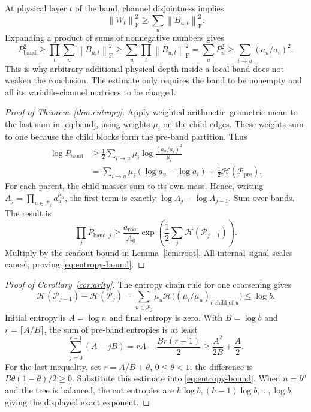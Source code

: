 \documentclass[11pt]{article}
\theoremstyle{remark}\newtheorem{remark}[theorem]{Remark}
\newcommand{\norm}[1]{\left\lVert#1\right\rVert}
\newcommand{\cP}{\mathcal P}
\newcommand{\ent}{\mathcal H}
\begin{document}
At physical layer $t$ of the band, channel disjointness implies
\[
 \norm{W_t}_{\mathrm F}^2\ge\sum_u
                    \norm{B_{u,t}}_{\mathrm F}^2.
\]
Expanding a product of sums of nonnegative numbers gives
\begin{equation}\label{eq:band}
 P_{\mathrm{band}}^2
 \ge\prod_t\sum_u\norm{B_{u,t}}_{\mathrm F}^2
 \ge\sum_u\prod_t\norm{B_{u,t}}_{\mathrm F}^2
 =\sum_u P_u^2
 \ge\sum_{i\to u}(a_u/a_i)^2.
\end{equation}
This is why arbitrary additional physical depth inside a local band does not
weaken the conclusion. The estimate only requires the band to be nonempty
and all its variable-channel matrices to be charged.

\begin{proof}[Proof of Theorem~\ref{thm:entropy}]
Apply weighted arithmetic--geometric mean to the last sum in
\eqref{eq:band}, using weights $\mu_i$ on the child edges. These weights sum
to one because the child blocks form the pre-band partition. Thus
\begin{align*}
 \log P_{\mathrm{band}}
 &\ge\frac12\sum_{i\to u}\mu_i
                   \log\frac{(a_u/a_i)^2}{\mu_i}\\
 &=\sum_{i\to u}\mu_i(\log a_u-\log a_i)
           +\frac12\ent(\cP_{\mathrm{pre}}).
\end{align*}
For each parent, the child masses sum to its own mass. Hence, writing
$A_j=\prod_{u\in\cP_j}a_u^{\mu_u}$, the first term is exactly
$\log A_j-\log A_{j-1}$. Sum over bands. The result is
\[
 \prod_j P_{\mathrm{band},j}
 \ge\frac{a_{\mathrm{root}}}{A_0}
           \exp\!\left(\frac12\sum_j\ent(\cP_{j-1})\right).
\]
Multiply by the readout bound in Lemma~\ref{lem:root}. All internal signal
scales cancel, proving \eqref{eq:entropy-bound}.
\end{proof}

\begin{proof}[Proof of Corollary~\ref{cor:arity}]
The entropy chain rule for one coarsening gives
\[
 \ent(\cP_{j-1})-\ent(\cP_j)
 =\sum_{u\in\cP_j}\mu_u
       \ent\bigl((\mu_i/\mu_u)_{i\text{ child of }u}\bigr)
 \le\log b.
\]
Initial entropy is $A=\log n$ and final entropy is zero. With $B=\log b$
and $r=\lceil A/B\rceil$, the sum of pre-band entropies is at least
\[
 \sum_{j=0}^{r-1}(A-jB)
   =rA-\frac{Br(r-1)}2
   \ge\frac{A^2}{2B}+\frac A2.
\]
For the last inequality, set $r=A/B+\theta$, $0\le\theta<1$; the difference
is $B\theta(1-\theta)/2\ge0$. Substitute this estimate into
\eqref{eq:entropy-bound}. When $n=b^h$ and the tree is balanced, the cut
entropies are $h\log b,(h-1)\log b,\ldots,\log b$, giving the displayed
exact exponent.
\end{proof}
\end{document}

